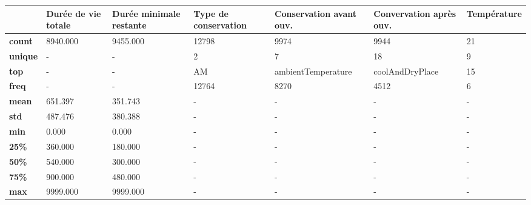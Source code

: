 \begin{tabularx}{\linewidth}{lXXXXXX}
\toprule
{} &  Durée de vie totale &  Durée minimale restante & Type de conservation & Conservation avant ouv. & Convervation après ouv. & Température \\
\midrule
\textbf{count } &             8940.000 &                 9455.000 &                12798 &                    9974 &                    9944 &          21 \\
\textbf{unique} &                    - &                        - &                    2 &                       7 &                      18 &           9 \\
\textbf{top   } &                    - &                        - &                   AM &      ambientTemperature &         coolAndDryPlace &          15 \\
\textbf{freq  } &                    - &                        - &                12764 &                    8270 &                    4512 &           6 \\
\textbf{mean  } &              651.397 &                  351.743 &                    - &                       - &                       - &           - \\
\textbf{std   } &              487.476 &                  380.388 &                    - &                       - &                       - &           - \\
\textbf{min   } &                0.000 &                    0.000 &                    - &                       - &                       - &           - \\
\textbf{25\%   } &              360.000 &                  180.000 &                    - &                       - &                       - &           - \\
\textbf{50\%   } &              540.000 &                  300.000 &                    - &                       - &                       - &           - \\
\textbf{75\%   } &              900.000 &                  480.000 &                    - &                       - &                       - &           - \\
\textbf{max   } &             9999.000 &                 9999.000 &                    - &                       - &                       - &           - \\
\bottomrule
\end{tabularx}
